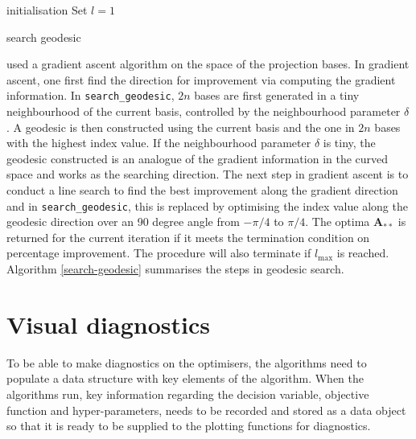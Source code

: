 \documentclass[12pt]{article}
\begin{document}
\begin{algorithm}
\SetAlgoLined
{}
  initialisation\;
  Set $l = 1$\;
  \caption{search geodesic}
  \label{search-geodesic}
\end{algorithm}

\citet{cook1995grand} used a gradient ascent algorithm on the space of the projection bases. In gradient ascent, one first find the direction for improvement via computing the gradient information. In \texttt{search\_geodesic}, \(2n\) bases are first generated in a tiny neighbourhood of the current basis, controlled by the neighbourhood parameter \(\delta\). A geodesic is then constructed using the current basis and the one in \(2n\) bases with the highest index value. If the neighbourhood parameter \(\delta\) is tiny, the geodesic constructed is an analogue of the gradient information in the curved space and works as the searching direction. The next step in gradient ascent is to conduct a line search to find the best improvement along the gradient direction and in \texttt{search\_geodesic}, this is replaced by optimising the index value along the geodesic direction over an 90 degree angle from \(-\pi/4\) to \(\pi/4\). The optima \(\mathbf{A}_{**}\) is returned for the current iteration if it meets the termination condition on percentage improvement. The procedure will also terminate if \(l_{\max}\) is reached. Algorithm \ref{search-geodesic} summarises the steps in geodesic search.

\hypertarget{vis-diag}{%
\section{Visual diagnostics}\label{vis-diag}}

To be able to make diagnostics on the optimisers, the algorithms need to populate a data structure with key elements of the algorithm. When the algorithms run, key information regarding the decision variable, objective function and hyper-parameters, needs to be recorded and stored as a data object so that it is ready to be supplied to the plotting functions for diagnostics.
\end{document}
